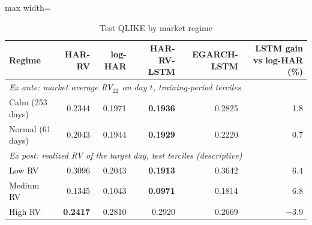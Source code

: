 \begin{table}[htbp]
\centering
\caption{Test QLIKE by market regime}
\label{tab:regimes}
\small
\begin{adjustbox}{max width=\textwidth}
\begin{tabular}{lrrrrr}
\toprule
Regime & HAR-RV & log-HAR & HAR-RV-LSTM & EGARCH-LSTM & LSTM gain vs log-HAR (\%) \\
\midrule
\multicolumn{6}{l}{\emph{Ex ante: market average RV$_{22}$ on day $t$, training-period terciles}}\\
Calm (253 days) & 0.2344 & 0.1971 & \textbf{0.1936} & 0.2825 & 1.8 \\
Normal (61 days) & 0.2043 & 0.1944 & \textbf{0.1929} & 0.2220 & 0.7 \\
\midrule
\multicolumn{6}{l}{\emph{Ex post: realized RV of the target day, test terciles (descriptive)}}\\
Low RV & 0.3096 & 0.2043 & \textbf{0.1913} & 0.3642 & 6.4 \\
Medium RV & 0.1345 & 0.1043 & \textbf{0.0971} & 0.1814 & 6.8 \\
High RV & \textbf{0.2417} & 0.2810 & 0.2920 & 0.2669 & $-$3.9 \\
\bottomrule
\end{tabular}
\end{adjustbox}
\end{table}
